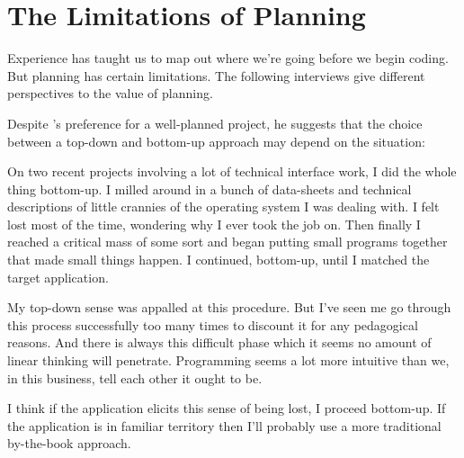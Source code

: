 \section{The Limitations of Planning}%
%

Experience has taught us to map out where we're going before we begin
coding. But planning has certain limitations. The following interviews
give different perspectives to the value of planning.%
\begin{interview}
\noindent Despite 's preference for a well-planned
project, he suggests that the choice between a top-down and bottom-up
approach may depend on the situation:

\begin{tfquot}
On two recent projects involving a lot of technical interface work, I
did the whole thing bottom-up. I milled around in a bunch of
data-sheets and technical descriptions of little crannies of the
operating system I was dealing with. I felt lost most of the time,
wondering why I ever took the job on.  Then finally I reached a
critical mass of some sort and began putting small programs together
that made small things happen. I continued, bottom-up, until I matched
the target application.

My top-down sense was appalled at this procedure. But I've seen me go
through this process successfully too many times to discount it for
any pedagogical reasons. And there is always this difficult phase
which it seems no amount of linear thinking will penetrate.
Programming seems a lot more intuitive than we, in this business, tell
each other it ought to be.

I think if the application elicits this sense of being lost, I proceed
bottom-up. If the application is in familiar territory then I'll
probably use a more traditional by-the-book approach.
\end{tfquot}
\end{interview}


